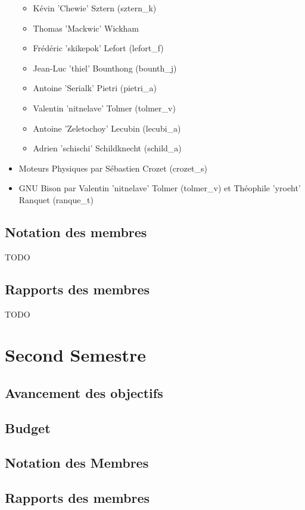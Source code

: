 \documentclass[12pt]{report}
\begin{document}
\begin{itemize}
\begin{itemize}
                            \item Kévin 'Chewie' Sztern (sztern\_k)
                            \item Thomas 'Mackwic' Wickham
                            \item Frédéric 'skikepok' Lefort (lefort\_f)
                            \item Jean-Luc 'thiel' Bounthong (bounth\_j)
                            \item Antoine 'Serialk' Pietri (pietri\_a)
                            \item Valentin 'nitnelave' Tolmer (tolmer\_v)
                            \item Antoine 'Zeletochoy' Lecubin (lecubi\_a)
                            \item Adrien 'schischi' Schildknecht (schild\_a)
                    \end{itemize}
            \item Moteurs Physiques par Sébastien Crozet (crozet\_s)
            \item GNU Bison par Valentin 'nitnelave' Tolmer (tolmer\_v) et
                    Théophile 'yroeht' Ranquet (ranque\_t)
    \end{itemize}
    \section{Notation des membres}
        TODO
    \section{Rapports des membres}
        TODO
    \chapter{Second Semestre}
    \section{Avancement des objectifs}
    \section{Budget}
    \section{Notation des Membres}
    \section{Rapports des membres}
\end{document}
